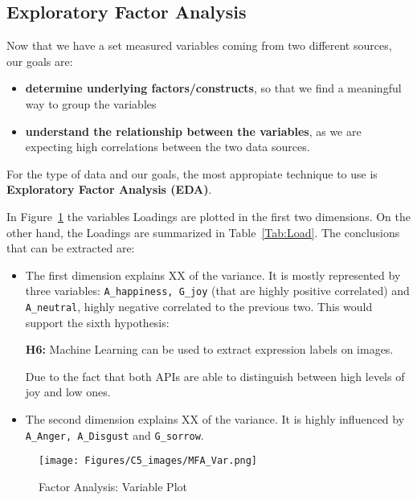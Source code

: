 % 
% 
% 
% 
% 

\subsection{Exploratory Factor Analysis}
Now that we have a set measured variables coming from two different sources, our goals are:

\begin{itemize}
\item \textbf{determine underlying factors/constructs}, so that we find a meaningful way to group the variables
\item \textbf{understand the relationship between the variables}, as we are expecting high correlations between the two data sources.
\end{itemize}

For the type of data and our goals, the most appropiate technique to use is \textbf{Exploratory Factor Analysis (EDA)}. 

In Figure~\ref{fig:FA_vble} the variables Loadings are plotted in the first two dimensions. On the other hand, the Loadings are summarized in Table~\ref{Tab:Load}. The conclusions that can be extracted are:
\begin{itemize}
\item The first dimension explains XX of the variance. It is mostly represented by three variables: \texttt{A\_happiness, G\_joy} (that are highly positive correlated) and \texttt{A\_neutral}, highly negative correlated to the previous two. This would support the sixth hypothesis:
\begin{tcolorbox}
\textbf{H6:} Machine Learning can be used to extract expression labels on images.
\end{tcolorbox}
Due to the fact that both APIs are able to distinguish between high levels of joy and low ones.
\item The second dimension explains XX of the variance. It is highly influenced by \texttt{A\_Anger, A\_Disgust} and \texttt{G\_sorrow}.
\end{itemize}

\begin{figure}[H]
\centering
\texttt{[image: Figures/C5\_images/MFA\_Var.png]}
\caption{Factor Analysis: Variable Plot}
\label{fig:FA_vble}
\end{figure}

